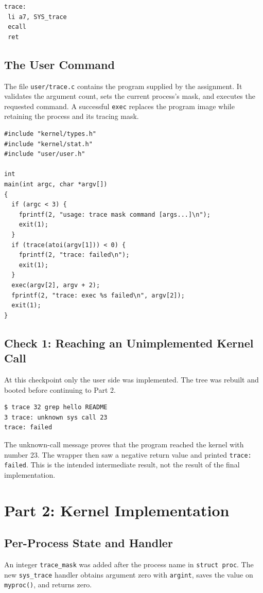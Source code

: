\documentclass[12pt,a4paper]{article}
\begin{document}
\begin{lstlisting}[caption={Generated trace stub in user/usys.S}]
trace:
 li a7, SYS_trace
 ecall
 ret
\end{lstlisting}

\subsection{The User Command}
The file \texttt{user/trace.c} contains the program supplied by the assignment.
It validates the argument count, sets the current process's mask, and executes
the requested command. A successful \texttt{exec} replaces the program image
while retaining the process and its tracing mask.

\begin{lstlisting}[caption={Complete user/trace.c compiled in the VM}]
#include "kernel/types.h"
#include "kernel/stat.h"
#include "user/user.h"

int
main(int argc, char *argv[])
{
  if (argc < 3) {
    fprintf(2, "usage: trace mask command [args...]\n");
    exit(1);
  }
  if (trace(atoi(argv[1])) < 0) {
    fprintf(2, "trace: failed\n");
    exit(1);
  }
  exec(argv[2], argv + 2);
  fprintf(2, "trace: exec %s failed\n", argv[2]);
  exit(1);
}
\end{lstlisting}

\subsection{Check 1: Reaching an Unimplemented Kernel Call}
At this checkpoint only the user side was implemented. The tree was rebuilt and
booted before continuing to Part 2.

\begin{lstlisting}[caption={Check 1: actual expected failure before the handler is installed}]
$ trace 32 grep hello README
3 trace: unknown sys call 23
trace: failed
\end{lstlisting}

The unknown-call message proves that the program reached the kernel with number
23. The wrapper then saw a negative return value and printed \texttt{trace: failed}.
This is the intended intermediate result, not the result of the final implementation.

\section{Part 2: Kernel Implementation}
\subsection{Per-Process State and Handler}
An integer \texttt{trace\_mask} was added after the process name in
\texttt{struct proc}. The new \texttt{sys\_trace} handler obtains argument zero
with \texttt{argint}, saves the value on \texttt{myproc()}, and returns zero.
\end{document}
